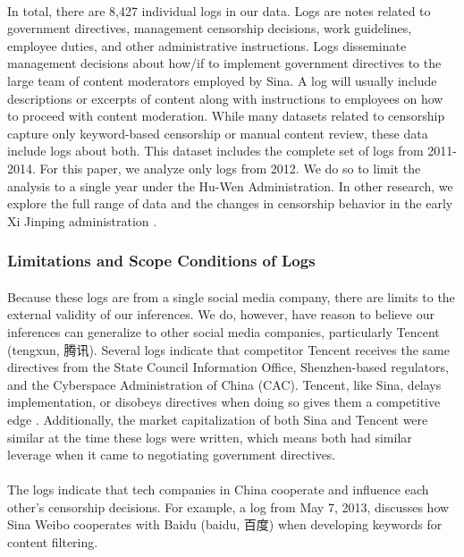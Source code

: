 \documentclass[12pt]{article}
\begin{document}
\begin{CJK*}{UTF8}{gbsn}
\paragraph{} In total, there are 8,427 individual logs in our data. Logs are notes related to government directives, management censorship decisions, work guidelines, employee duties, and other administrative instructions. Logs disseminate management decisions about how/if to implement government directives to the large team of content moderators employed by Sina. A log will usually include descriptions or excerpts of content along with instructions to employees on how to proceed with content moderation. While many datasets related to censorship capture only keyword-based censorship or manual content review, these data include logs about both. This dataset includes the complete set of logs from 2011-2014. For this paper, we analyze only logs from 2012. We do so to limit the analysis to a single year under the Hu-Wen Administration. In other research, we explore the full range of data and the changes in censorship behavior in the early Xi Jinping administration \citep{miller2018reassessing}.

\subsubsection{Limitations and Scope Conditions of Logs}

\paragraph{} Because these logs are from a single social media company, there are limits to the external validity of our inferences. We do, however, have reason to  believe our inferences can generalize to other social media companies, particularly Tencent (tengxun, 腾讯). Several logs indicate that competitor Tencent receives the same directives from the State Council Information Office, Shenzhen-based regulators, and the Cyberspace Administration of China (CAC). Tencent, like Sina, delays implementation, or disobeys directives when doing so gives them a competitive edge \citep{miller2016censorship}. Additionally, the market capitalization of both Sina and Tencent were similar at the time these logs were written, which means both had similar leverage when it came to negotiating government directives.
\paragraph{} The logs indicate that tech companies in China cooperate and influence each other's censorship decisions. For example, a log from May 7, 2013, discusses how Sina Weibo cooperates with Baidu (baidu, 百度) when developing keywords for content filtering.

\end{CJK*}
\end{document}
